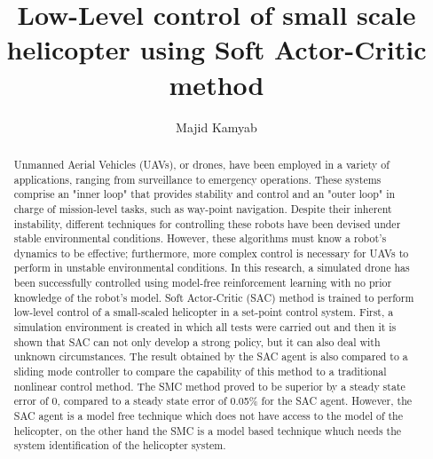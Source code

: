 
\degree{\MSc}






%



\title{Low-Level control of small scale helicopter using Soft Actor-Critic method}
\author{Majid Kamyab}%
\admin
\doublespacing        %




\begin{abstract}
\truedoublespacing

Unmanned Aerial Vehicles (UAVs), or drones, have been employed in a variety of applications, ranging from surveillance to emergency operations. These systems comprise an "inner loop" that provides stability and control and an "outer loop" in charge of mission-level tasks, such as way-point navigation. Despite their inherent instability, different techniques for controlling these robots have been devised under stable environmental conditions. However, these algorithms must know a robot's dynamics to be effective; furthermore, more complex control is necessary for UAVs to perform in unstable environmental conditions. In this research, a simulated drone has been successfully controlled using model-free reinforcement learning with no prior knowledge of the robot's model. Soft Actor-Critic (SAC) method is trained to perform low-level control of a small-scaled helicopter in a set-point control system. First, a simulation environment is created in which all tests were carried out and then it is shown that SAC can not only develop a strong policy, but it can also deal with unknown circumstances. The result obtained by the SAC agent is also compared to a sliding mode controller to compare the capability of this method to a traditional nonlinear control method. The SMC method proved to be superior by a steady state error of 0, compared to a steady state error of 0.05\% for the SAC agent. However, the SAC agent is a model free technique which does not have access to the model of the helicopter, on the other hand the SMC is a model based technique whuch needs the system identification of the helicopter system.
\end{abstract}



